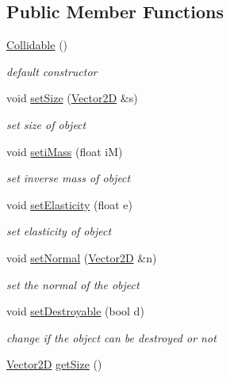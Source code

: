 \subsection*{Public Member Functions}
\begin{DoxyCompactItemize}
\item 
\hypertarget{class_collidable_a92ce9e2b08086bb2f466168ffc69c9ed}{\hyperlink{class_collidable_a92ce9e2b08086bb2f466168ffc69c9ed}{Collidable} ()}\label{class_collidable_a92ce9e2b08086bb2f466168ffc69c9ed}

\begin{DoxyCompactList}\small\item\em default constructor \end{DoxyCompactList}\item 
void \hyperlink{class_collidable_ae65b7398b66bdc89bef21ec9643ac0ff}{set\-Size} (\hyperlink{class_vector2_d}{Vector2\-D} \&s)
\begin{DoxyCompactList}\small\item\em set size of object \end{DoxyCompactList}\item 
void \hyperlink{class_collidable_a8d6d8c505ce98690d38f569a8643e530}{seti\-Mass} (float i\-M)
\begin{DoxyCompactList}\small\item\em set inverse mass of object \end{DoxyCompactList}\item 
void \hyperlink{class_collidable_ab47021e982cc06470e49a0e69d2c9b87}{set\-Elasticity} (float e)
\begin{DoxyCompactList}\small\item\em set elasticity of object \end{DoxyCompactList}\item 
void \hyperlink{class_collidable_a0632214472cc5139d932310b2407ffdb}{set\-Normal} (\hyperlink{class_vector2_d}{Vector2\-D} \&n)
\begin{DoxyCompactList}\small\item\em set the normal of the object \end{DoxyCompactList}\item 
void \hyperlink{class_collidable_af690d866683d4c72c911911271fd3286}{set\-Destroyable} (bool d)
\begin{DoxyCompactList}\small\item\em change if the object can be destroyed or not \end{DoxyCompactList}\item 
\hypertarget{class_collidable_a6761b86e55d50be4f0a0c3a42bc81f81}{\hyperlink{class_vector2_d}{Vector2\-D} \hyperlink{class_collidable_a6761b86e55d50be4f0a0c3a42bc81f81}{get\-Size} ()}\label{class_collidable_a6761b86e55d50be4f0a0c3a42bc81f81}


\end{DoxyCompactItemize}
